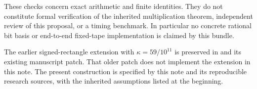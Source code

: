 These checks concern exact arithmetic and finite identities. They do not
constitute formal verification of the inherited multiplication theorem,
independent review of this proposal, or a timing benchmark. In particular
no concrete rational bit basis or end-to-end fixed-tape implementation is
claimed by this bundle.

The earlier signed-rectangle extension with $\kappa=59/10^{11}$ is preserved
in  and its existing manuscript
patch. That older patch does not implement the extension in this note.
The present construction is specified by this note and its reproducible
research sources, with the inherited assumptions listed at the beginning.
